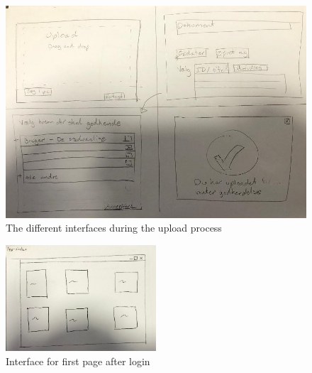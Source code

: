 \begin{figure}[H]
	\centering
		\includegraphics[width=\textwidth]{billeder/Upload-view.jpg}
		\caption{The different interfaces during the upload process}
		\label{fig:1-Upload}
\end{figure}

\begin{figure}[H]
	\centering
	\includegraphics[width=0.5\textwidth]{billeder/app-view.jpg}
	\caption{Interface for first page after login}
	\label{fig:1-app-view}
\end{figure}

